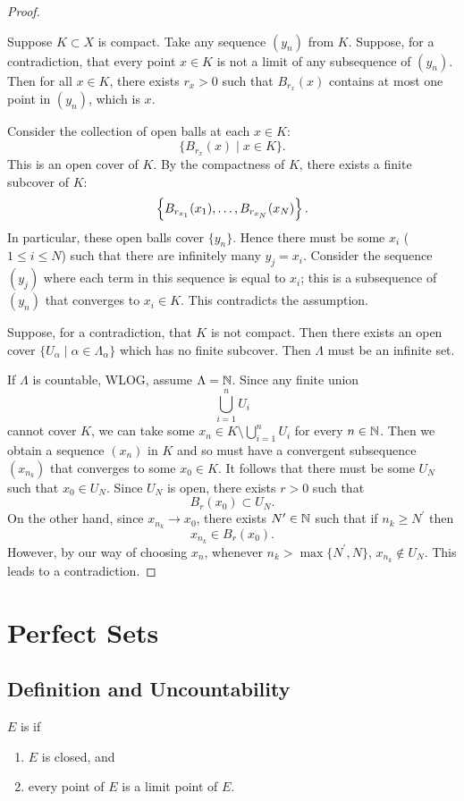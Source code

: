 \begin{proof} \

\forward Suppose $K\subset X$ is compact. Take any sequence $(y_n)$ from $K$. Suppose, for a contradiction, that every point $x\in K$ is not a limit of any subsequence of $(y_n)$. Then for all $x\in K$, there exists $r_x>0$ such that $B_{r_x}(x)$ contains at most one point in $(y_n)$, which is $x$.

Consider the collection of open balls at each $x\in K$:
\[\{B_{r_x}(x)\mid x\in K\}.\]
This is an open cover of $K$. By the compactness of $K$, there exists a finite subcover of $K$:
\[\left\{B_{r_{x_1}}(x_1),\dots,B_{r_{x_N}}(x_N)\right\}.\]
In particular, these open balls cover $\{y_n\}$. Hence there must be some $x_i$ ($1\le i\le N$) such that there are infinitely many $y_j=x_i$. Consider the sequence $(y_j)$ where each term in this sequence is equal to $x_i$; this is a subsequence of $(y_n)$ that converges to $x_i\in K$. This contradicts the assumption.

\backward Suppose, for a contradiction, that $K$ is not compact. Then there exists an open cover $\{U_\alpha\mid \alpha\in \Lambda_\alpha\}$ which has no finite subcover. Then $\Lambda$ must be an infinite set.

If $\Lambda$ is countable, WLOG, assume $\Lambda=\mathbb N$. Since any finite union
\[\bigcup_{i=1}^{n}U_i\]
cannot cover $K$, we can take some $x_n\in K\setminus\bigcup_{i=1}^{n}U_i$ for every $n\in\mathbb N$. Then we obtain a sequence $(x_n)$ in $K$ and so must have a convergent subsequence $(x_{n_k})$ that converges to some $x_0\in K$. It follows that there must be some $U_N$ such that $x_0\in U_N$. Since $U_N$ is open, there exists $r>0$ such that 
\[B_r(x_0)\subset U_N.\]
On the other hand, since $x_{n_k}\to x_0$, there exists $N^\prime\in\mathbb N$ such that if $n_k\ge N^\prime$ then
\[x_{n_k}\in B_r(x_0).\]
However, by our way of choosing $x_n$, whenever $n_k>\max\{N^\prime,N\}$, $x_{n_k}\notin U_N$. This leads to a contradiction.
\end{proof}
\pagebreak

\section{Perfect Sets}
\subsection{Definition and Uncountability}
\begin{definition}
$E$ is  if
\begin{enumerate}[label=(\roman*)]
\item $E$ is closed, and
\item every point of $E$ is a limit point of $E$.
\end{enumerate}
\end{definition}

